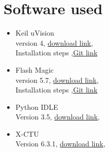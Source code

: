 \documentclass[a4paper,12pt,oneside]{book}
\begin{document}
\section{Software used}
\begin{itemize}
  \item Keil uVision 
  \\ version 4, \href{https://www.keil.com/demo/eval/arm.htm}{download link}, 
  \\ Installation steps ,\href{https://github.com/akshar100/eyantra-firebird-resources/tree/master/Fire%20Bird%20V%20LPC2148%202010-12-29}{Git link}
    
  \item Flash Magic 
  \\ version 5.7, \href{http://www.flashmagictool.com/}{download link}, 
  \\ Installation steps ,\href{https://github.com/akshar100/eyantra-firebird-resources/tree/master/Fire%20Bird%20V%20LPC2148%202010-12-29}{Git link}

\item Python IDLE 
  \\ Version 3.5, \href{https://www.python.org/downloads/}{download link}, 
    
\item X-CTU 
  \\ Version 6.3.1, \href{http://www.digi.com/products/xbee-rf-solutions/xctu-software/xctu#productsupport-utilities}{download link}, 
\end{itemize}
\newpage
\end{document}

